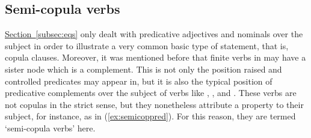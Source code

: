 
\subsection{Semi-copula verbs}
\label{subsec:semicop}

\hyperref[subsec:eqs]{Section~\ref*{subsec:eqs}} only dealt with predicative
adjectives and nominals over the subject in order to illustrate a very common
basic type of statement, that is, copula clauses. Moreover, it was mentioned
before that finite verbs in  may have a sister node which is a complement. This is not only the position raised and
controlled predicates may appear in, but it is also the typical position of
predicative complements over the subject of verbs like
,
, and
.
These verbs are not copulas in the strict sense, but they nonetheless attribute
a property to their subject, for instance, as in (\ref{ex:semicoppred}). For
this reason, they are termed `semi-copula verbs' here.

